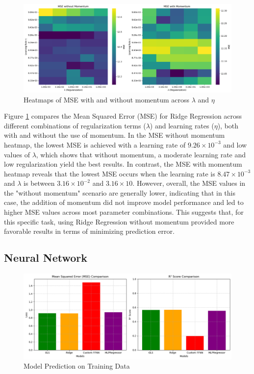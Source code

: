 \documentclass{article}
\newcommand{\0}{\mathbf{0}}
\newcommand{\1}{\mathbf{1}}
\begin{document}
\begin{figure}[h!]
    \centering
    \includegraphics[width=1.2\linewidth]{MSE_Ridge_heatmap_TaskA_2_2.png}
    \caption{Heatmaps of MSE with and without momentum across \(\lambda\) and \(\eta\) }
    \label{MSE_Ridge_heatmap_TaskA_2_2}
\end{figure}



Figure \ref{MSE_Ridge_heatmap_TaskA_2_2} compares the Mean Squared Error (MSE) for Ridge Regression across different combinations of regularization terms (\(\lambda\)) and learning rates (\(\eta\)), both with and without the use of momentum. In the MSE without momentum heatmap, the lowest MSE is achieved with a learning rate of \(9.26 \times 10^{-3}\) and low values of \(\lambda\), which shows that without momentum, a moderate learning rate and low regularization yield the best results. In contrast, the MSE with momentum heatmap reveals that the lowest MSE occurs when the learning rate is \(8.47 \times 10^{-3}\) and \(\lambda\) is between \(3.16 \times 10^{-2}\) and \(3.16 \times 10\). However, overall, the MSE values in the "without momentum" scenario are generally lower, indicating that in this case, the addition of momentum did not improve model performance and led to higher MSE values across most parameter combinations. This suggests that, for this specific task, using Ridge Regression without momentum provided more favorable results in terms of minimizing prediction error.



\subsection{Neural Network}

\begin{figure}[h!]
    \centering
    \includegraphics[width=0.9\linewidth]{Results_Obtained_linear_and_NN_code_taskB_1.png}
    \caption{Model Prediction on Training Data}
    \label{Results_Obtained_linear_and_NN_code_taskB_1}
\end{figure}
\end{document}
